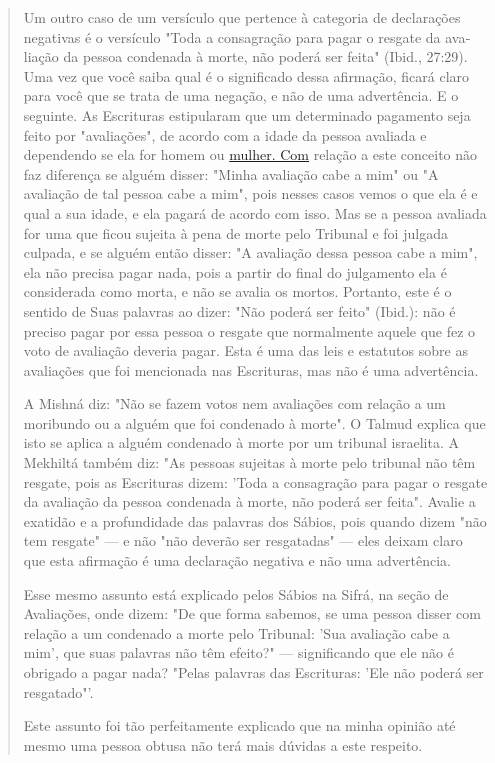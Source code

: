 \begin{quote}
Um outro caso de um versículo que pertence à categoria de declara­ções
negativas é o versículo "Toda a consagração para pagar o resgate da
ava­liação da pessoa condenada à morte, não poderá ser feita" (Ibid.,
27:29). Uma vez que você saiba qual é o significado dessa afirmação,
ficará claro para você que se trata de uma negação, e não de uma
advertência. E o seguinte. As Escri­turas estipularam que um determinado
pagamento seja feito por "avaliações", de acordo com a idade da pessoa
avaliada e dependendo se ela for homem ou
\href{http://mulher.Com}{{mulher. Com}} relação a este conceito não faz
diferença se alguém disser: "Mi­nha avaliação cabe a mim" ou "A
avaliação de tal pessoa cabe a mim", pois nesses casos vemos o que ela é
e qual a sua idade, e ela pagará de acordo com isso. Mas se a pessoa
avaliada for uma que ficou sujeita à pena de morte pelo Tribunal e foi
julgada culpada, e se alguém então disser: "A avaliação dessa pes­soa
cabe a mim", ela não precisa pagar nada, pois a partir do final do
julgamen­to ela é considerada como morta, e não se avalia os mortos.
Portanto, este é o sentido de Suas palavras ao dizer: "Não poderá ser
feito" (Ibid.): não é preci­so pagar por essa pessoa o resgate que
normalmente aquele que fez o voto de avaliação deveria pagar. Esta é uma
das leis e estatutos sobre as avaliações que foi mencionada nas
Escrituras, mas não é uma advertência.

A Mishná diz: "Não se fazem votos nem avaliações com relação a um
moribundo ou a alguém que foi condenado à morte". O Talmud explica que
isto se aplica a alguém condenado à morte por um tribunal israelita. A
Mekhiltá também diz: "As pessoas sujeitas à morte pelo tribunal não têm
resgate, pois as Escrituras dizem: 'Toda a consagração para pagar o
resgate da avaliação da pessoa condenada à morte, não poderá ser feita".
Avalie a exatidão e a profun­didade das palavras dos Sábios, pois quando
dizem "não tem resgate" --- e não "não deverão ser resgatadas" --- eles
deixam claro que esta afirmação é uma declaração negativa e não uma
advertência.

Esse mesmo assunto está explicado pelos Sábios na Sifrá, na seção de
Avaliações, onde dizem: "De que forma sabemos, se uma pessoa disser com
relação a um condenado a morte pelo Tribunal: 'Sua avaliação cabe a
mim', que suas palavras não têm efeito?" --- significando que ele não é
obrigado a pagar nada? "Pelas palavras das Escrituras: 'Ele não poderá
ser resgatado"'.

Este assunto foi tão perfeitamente explicado que na minha opinião até
mesmo uma pessoa obtusa não terá mais dúvidas a este respeito.
\end{quote}

